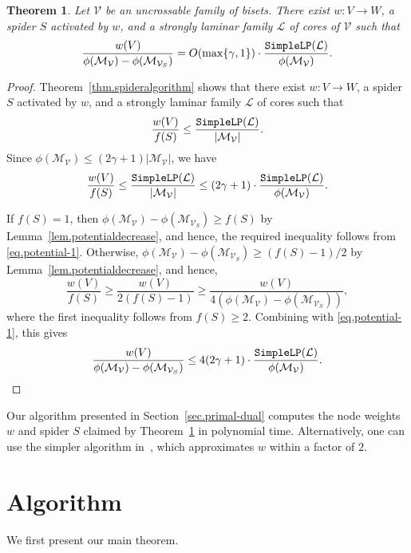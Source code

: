 \documentclass[11pt]{article}
\newtheorem{theorem}{Theorem}
\newcommand{\Mfam}{\mathcal{M}}
\newcommand{\Vfam}{\mathcal{V}}
\newcommand{\Lfam}{\mathcal{L}}
\newcommand{\CoreLP}{{\tt SimpleLP}}
\begin{document}
\begin{theorem}\label{thm.potential-spider}
 Let $\Vfam$ be an uncrossable family of bisets.
 There exist $w\colon V \rightarrow W$,
 a spider $S$ activated by $w$,
 and a strongly laminar family $\Lfam$ of cores of $\Vfam$
 such that 
 \[
  \frac{w(V)}{\phi(\Mfam_{\Vfam})-\phi(\Mfam_{\Vfam_{S}})} = O(\max\{\gamma,1\})
 \cdot \frac{\CoreLP(\Lfam)}{\phi(\Mfam_{\Vfam})}.
 \]
\end{theorem}
\begin{proof}
 Theorem~\ref{thm.spideralgorithm} shows that
 there exist $w\colon V\rightarrow W$, 
 a spider $S$ activated by $w$, and a strongly laminar family $\Lfam$ of cores
 such that
 \[
  \frac{w(V)}{f(S)} \leq \frac{\CoreLP(\Lfam)}{|\Mfam_{\Vfam}|}.
 \]
 Since $\phi(\Mfam_{\Vfam}) \leq (2\gamma+1)|\Mfam_{\Vfam}|$, we have
\begin{equation}\label{eq.potential-1}
 \frac{w(V)}{f(S)} \leq  \frac{\CoreLP(\Lfam)}{|\Mfam_{\Vfam}|} \leq
 (2\gamma+1) \cdot \frac{\CoreLP(\Lfam)}{\phi(\Mfam_{\Vfam})}.
\end{equation}


 If $f(S)=1$, then $\phi(\Mfam_{\Vfam})-\phi(\Mfam_{\Vfam_S}) \geq f(S)$ by
 Lemma~\ref{lem.potentialdecrease}, and hence, the required inequality
 follows from \eqref{eq.potential-1}.
 Otherwise,
 $\phi(\Mfam_{\Vfam})-\phi(\Mfam_{\Vfam_S}) \geq (f(S)-1)/2$ by
 Lemma~\ref{lem.potentialdecrease}, and hence,
\[
  \frac{w(V)}{f(S)} \geq 
  \frac{w(V)}{2(f(S)-1)} \geq 
\frac{w(V)}{4(\phi(\Mfam_{\Vfam})-\phi(\Mfam_{\Vfam_S}))},
\]
 where the first inequality follows from $f(S)\geq 2$.
Combining with \eqref{eq.potential-1}, this gives
\[
\frac{w(V)}{\phi(\Mfam_{\Vfam})-\phi(\Mfam_{\Vfam_S})} \leq
 4(2\gamma+1)\cdot \frac{\CoreLP(\Lfam)}{\phi(\Mfam_{\Vfam})}.
\]
\end{proof}

Our algorithm presented in Section~\ref{sec.primal-dual}
computes the node weights $w$ and spider $S$ claimed by
Theorem~\ref{thm.potential-spider} in polynomial time. 
Alternatively, one can use the 
simpler algorithm in~\cite{Nutov13activation}, which approximates $w$
within a factor of $2$.


\section{Algorithm}
\label{sec.algorithm}

We first present our main theorem.
\end{document}
